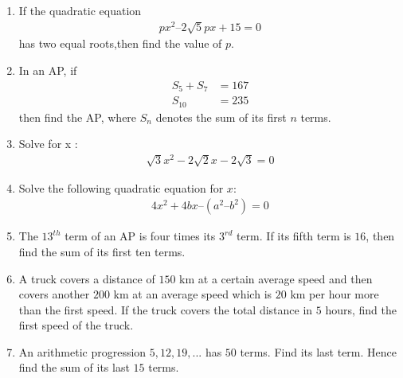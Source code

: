 \begin{enumerate}
\item If the quadratic equation
 \begin{align*}
  px^2 – 2 \sqrt{5}px + 15 = 0
 \end{align*}
has two equal roots,then find the value of $p$.

\item In an AP, if 
\begin{align*}
 S_5 + S_7 &= 167\\  
 S_{10}&= 235
\end{align*}
then find the AP, where $S_n$ denotes the sum of its first $n$ terms.
\item Solve for x :
 \begin{align*}
     \sqrt{3}x^2 -2\sqrt{2}x-2\sqrt{3}= 0 
 \end{align*}
\item Solve the following quadratic equation for $x$:
     \begin{align*}
     4x^{2} + 4bx – (a^{2}–b^{2}) = 0
     \end{align*}
\item The $13^{th}$ term of an AP is four times its $3^{rd}$ term. If its fifth term is $16$, then find the sum of its first ten terms.
\item A truck covers a distance of $150$ km at a certain average speed and then covers another $200$ km at an average speed which is $20$ km per hour more than the first speed. If the truck covers the total distance in $5$ hours, find the first speed of the truck.
\item An arithmetic progression $5, 12, 19, ...$ has $50$ terms. Find its last term. Hence find the sum of its last $15$ terms.

\end{enumerate}
